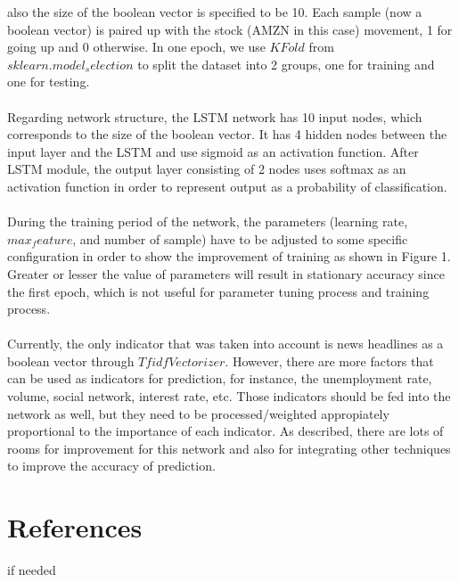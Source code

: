 \documentclass{article}
\begin{document}
 also the size of the boolean vector is specified to be 10. Each sample (now a boolean vector) is paired up with
 the stock (AMZN in this case) movement, 1 for going up and 0 otherwise. In one epoch, we use $KFold$ from
 $sklearn.model_selection$ to split the dataset into 2 groups, one for training and one for testing.
\\\\
 Regarding network structure, the LSTM network has 10 input nodes, which corresponds to the size of
 the boolean vector. It has 4 hidden nodes between the input layer and the LSTM and use sigmoid as an activation
 function. After LSTM module, the output layer consisting of 2 nodes uses softmax as an activation function in order
 to represent output as a probability of classification.
\\\\
During the training period of the network, the parameters (learning rate, $max_feature$, and number of sample) have
 to be adjusted to some specific configuration in order to show the improvement of training as shown in Figure 1.
 Greater or lesser the value of parameters will result in stationary accuracy since the first epoch, which is not
 useful for parameter tuning process and training process.
\\\\
Currently, the only indicator that was taken into account is news headlines as a boolean vector through $TfidfVectorizer$.
 However, there are more factors that can be used as indicators for prediction, for instance, the unemployment rate,
 volume, social network, interest rate, etc. Those indicators should be fed into the network as well, but they need
 to be processed/weighted appropiately proportional to the importance of each indicator. As described, there are lots
 of rooms for improvement for this network and also for integrating other techniques to improve the accuracy of prediction.
\section*{References}
if needed
\end{document}
